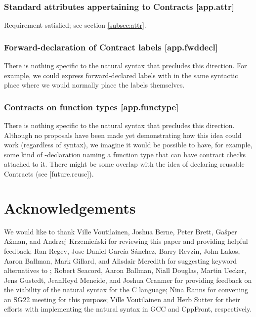 \subsubsection{Standard attributes appertaining to Contracts  [app.attr]}

Requirement satisfied; see section \ref{subsec:attr}.

\subsubsection{ Forward-declaration of Contract labels  [app.fwddecl]}

There is nothing specific to the natural syntax that precludes this direction. For example, we could express forward-declared labels with  in the same syntactic place where we would normally place the labels themselves.

\subsubsection{Contracts on function types  [app.functype]}

There is nothing specific to the natural syntax that precludes this direction. Although no proposals have been made yet demonstrating how this idea could work (regardless of syntax), we imagine it would be possible to have, for example, some kind of -declaration naming a function type that can have contract checks attached to it. There might be some overlap with the idea of declaring reusable Contracts (see [future.reuse]).

\section*{Acknowledgements}

We would like to thank Ville Voutilainen, Joshua Berne, Peter Brett, Ga\v sper A\v zman, and Andrzej Krzemie\' nski for reviewing this paper and providing helpful feedback;
Ran Regev, Jose Daniel Garc\' ia S\' anchez, Barry Revzin, John Lakos, Aaron Ballman, Mark Gillard, and Alisdair Meredith for suggesting keyword alternatives to ; 
Robert Seacord, Aaron Ballman, Niall Douglas, Martin Uecker, Jens Gustedt, JeanHeyd Meneide, and Joshua Cranmer for providing feedback on the viability of the natural syntax for the C language; 
Nina Ranns for convening an SG22 meeting for this purpose; Ville Voutilainen and Herb Sutter for their efforts with implementing the natural syntax in GCC and CppFront, respectively.

